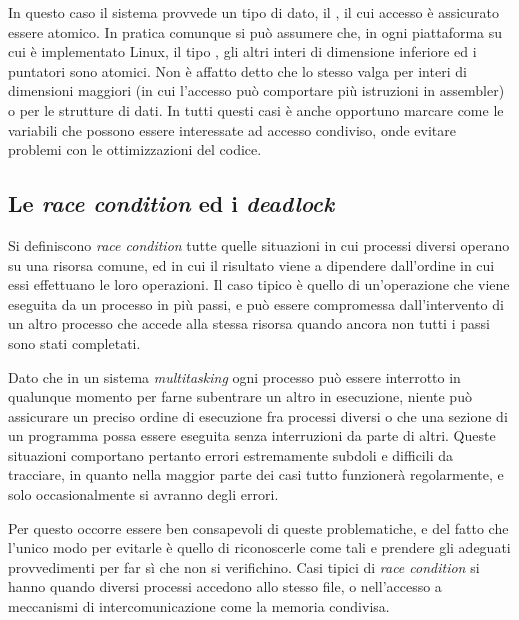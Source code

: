 In questo caso il sistema provvede un tipo di dato, il ,
il cui accesso è assicurato essere atomico.  In pratica comunque si può
assumere che, in ogni piattaforma su cui è implementato Linux, il tipo
, gli altri interi di dimensione inferiore ed i puntatori sono
atomici. Non è affatto detto che lo stesso valga per interi di dimensioni
maggiori (in cui l'accesso può comportare più istruzioni in assembler) o per
le strutture di dati. In tutti questi casi è anche opportuno marcare come
 le variabili che possono essere interessate ad accesso
condiviso, onde evitare problemi con le ottimizzazioni del codice.



\subsection{Le \textit{race condition} ed i \textit{deadlock}}
\label{sec:proc_race_cond}


Si definiscono \textit{race condition} tutte quelle situazioni in cui processi
diversi operano su una risorsa comune, ed in cui il risultato viene a
dipendere dall'ordine in cui essi effettuano le loro operazioni. Il caso
tipico è quello di un'operazione che viene eseguita da un processo in più
passi, e può essere compromessa dall'intervento di un altro processo che
accede alla stessa risorsa quando ancora non tutti i passi sono stati
completati.

Dato che in un sistema \textit{multitasking} ogni processo può essere
interrotto in qualunque momento per farne subentrare un altro in esecuzione,
niente può assicurare un preciso ordine di esecuzione fra processi diversi o
che una sezione di un programma possa essere eseguita senza interruzioni da
parte di altri. Queste situazioni comportano pertanto errori estremamente
subdoli e difficili da tracciare, in quanto nella maggior parte dei casi tutto
funzionerà regolarmente, e solo occasionalmente si avranno degli errori.

Per questo occorre essere ben consapevoli di queste problematiche, e del fatto
che l'unico modo per evitarle è quello di riconoscerle come tali e prendere
gli adeguati provvedimenti per far sì che non si verifichino. Casi tipici di
\textit{race condition} si hanno quando diversi processi accedono allo stesso
file, o nell'accesso a meccanismi di intercomunicazione come la memoria
condivisa. 


